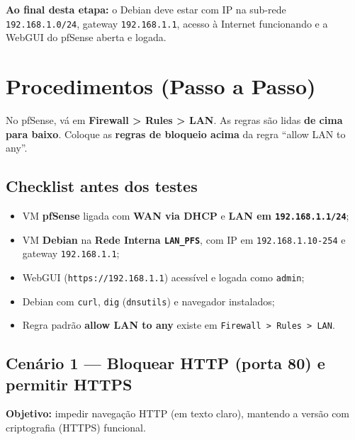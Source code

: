 \begin{notebox}
\textbf{Ao final desta etapa:} o Debian deve estar com IP na sub-rede \texttt{192.168.1.0/24}, gateway \texttt{192.168.1.1}, acesso à Internet funcionando e a WebGUI do pfSense aberta e logada.
\end{notebox}

\section{Procedimentos (Passo a Passo)}

\begin{notebox}
No pfSense, vá em \textbf{Firewall > Rules > LAN}. As regras são lidas \textbf{de cima para baixo}. Coloque as \textbf{regras de bloqueio acima} da regra ``allow LAN to any''.
\end{notebox}

\subsection*{Checklist antes dos testes}

\begin{itemize}
  \item VM \textbf{pfSense} ligada com \textbf{WAN via DHCP} e \textbf{LAN em \texttt{192.168.1.1/24}};
  \item VM \textbf{Debian} na \textbf{Rede Interna \texttt{LAN\_PFS}}, com IP em \texttt{192.168.1.10-254} e gateway \texttt{192.168.1.1};
  \item WebGUI (\texttt{https://192.168.1.1}) acessível e logada como \texttt{admin};
  \item Debian com \texttt{curl}, \texttt{dig} (\texttt{dnsutils}) e navegador instalados;
  \item Regra padrão \textbf{allow LAN to any} existe em \texttt{Firewall > Rules > LAN}.
\end{itemize}

\subsection{Cenário 1 --- Bloquear HTTP (porta 80) e permitir HTTPS}

\textbf{Objetivo:} impedir navegação HTTP (em texto claro), mantendo a versão com criptografia (HTTPS) funcional.

